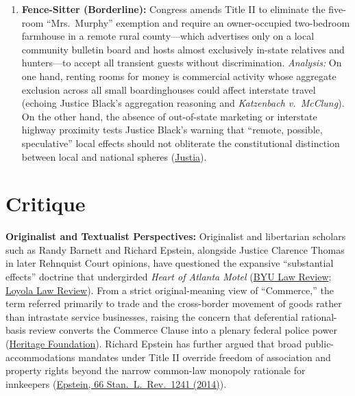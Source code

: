 \documentclass[12pt]{article}
\begin{document}
\begin{enumerate}
\item \textbf{Fence-Sitter (Borderline):} Congress amends Title II to eliminate the five-room ``Mrs.\ Murphy'' exemption and require an owner-occupied two-bedroom farmhouse in a remote rural county---which advertises only on a local community bulletin board and hosts almost exclusively in-state relatives and hunters---to accept all transient guests without discrimination. \textit{Analysis:} On one hand, renting rooms for money is commercial activity whose aggregate exclusion across all small boardinghouses could affect interstate travel (echoing Justice Black's aggregation reasoning and \textit{Katzenbach v.\ McClung}). On the other hand, the absence of out-of-state marketing or interstate highway proximity tests Justice Black's warning that ``remote, possible, speculative'' local effects should not obliterate the constitutional distinction between local and national spheres (\href{https://supreme.justia.com/cases/federal/us/379/241/}{Justia}).
\end{enumerate}

\section{Critique}
\textbf{Originalist and Textualist Perspectives:} Originalist and libertarian scholars such as Randy Barnett and Richard Epstein, alongside Justice Clarence Thomas in later Rehnquist Court opinions, have questioned the expansive ``substantial effects'' doctrine that undergirded \textit{Heart of Atlanta Motel} (\href{https://digitalcommons.law.byu.edu/cgi/viewcontent.cgi?article=3408&context=lawreview}{BYU Law Review}; \href{https://dspace.loyno.edu/jspui/bitstream/123456789/131/1/Article\%204\%20-\%20McGoldrick_PRINT.pdf}{Loyola Law Review}). From a strict original-meaning view of ``Commerce,'' the term referred primarily to trade and the cross-border movement of goods rather than intrastate service businesses, raising the concern that deferential rational-basis review converts the Commerce Clause into a plenary federal police power (\href{https://constitution.heritage.org/essays/a1-s8-c3-b/}{Heritage Foundation}). Richard Epstein has further argued that broad public-accommodations mandates under Title II override freedom of association and property rights beyond the narrow common-law monopoly rationale for innkeepers (\href{https://chicagounbound.uchicago.edu/cgi/viewcontent.cgi?article=8104&context=journal_articles}{Epstein, 66 Stan.\ L.\ Rev.\ 1241 (2014)}).
\end{document}
